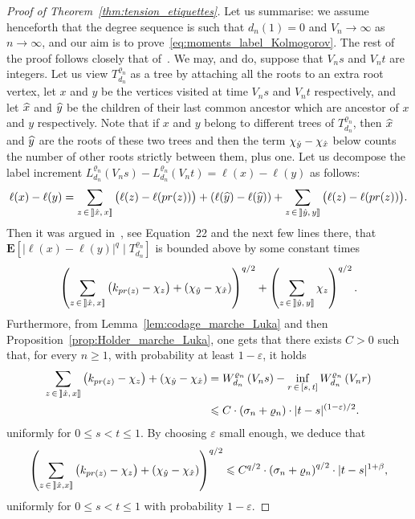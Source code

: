 \documentclass[AHL,Unicode,longabstracts,published]{cedram}
\newcommand{\rrbracket}{\mathclose{]\mkern -2.7mu]}}
\newcommand{\ensembles}[1]{\mathbf{#1}}
\newcommand{\E}{\ensembles{E}}
\newcommand{\1}{\ensembles{1}}
\renewcommand{\le}{\leqslant}
\renewcommand{\ge}{\geqslant}
\newcommand{\fn}{T_{d_n}^{\varrho_n}}
\newcommand{\Wfn}{W_{d_n}^{\varrho_n}}
\newcommand{\Lfn}{L_{d_n}^{\varrho_n}}
\newcommand{\vertices}{V}
\let\oldhat\hat
\renewcommand*{\hat}[1]{\mathchoice{\widehat{#1}}{\widehat{#1}}{\oldhat{#1}}{\oldhat{#1}}}
\begin{document}
\begin{proof}[Proof of Theorem~\ref{thm:tension_etiquettes}]
Let us summarise: we assume henceforth that the degree sequence is such that $d_{n}(1) = 0$ and $\vertices_{n} \to \infty$ as $n\to \infty$, and our aim is to prove~\eqref{eq:moments_label_Kolmogorov}. The rest of the proof follows closely that of~\cite[Proposition~7]{Mar18b}. We may, and do, suppose that $\vertices_n s$ and $\vertices_n t$ are integers. Let us view $\fn$ as a tree by attaching all the roots to an extra root vertex, let $x$ and $y$ be the vertices visited at time $\vertices_n s$ and $\vertices_n t$ respectively, and let $\hat{x}$ and $\hat{y}$ be the children of their last common ancestor which are ancestor of $x$ and $y$ respectively. Note that if $x$ and $y$ belong to different trees of $\fn$, then $\hat{x}$ and $\hat{y}$ are the roots of these two trees and then the term $\chi_{\hat{y}} - \chi_{\hat{x}}$ below counts the number of other roots strictly between them, plus one. Let us decompose the label increment $\Lfn(\vertices_n s) - \Lfn(\vertices_n t) = \ell(x)-\ell(y)$ as follows:
\[
\ell(x)-\ell(y) = \sum_{z\,\in\,\mathopen{\rrbracket} \hat{x},\,x \mathclose{\rrbracket}} \big(\ell(z)-\ell(pr(z))\big) + (\ell(\hat{y})-\ell(\hat{y})) + \sum_{z\,\in\,\mathopen{\rrbracket} \hat{y},\,y \mathclose{\rrbracket}} \big(\ell(z)-\ell(pr(z))\big).
\]
Then it was argued in~\cite{Mar18b}, see Equation~22 and the next few lines there, that $\E[|\ell(x)-\ell(y)|^q \mid \fn]$ is bounded above by some constant times
\[
\left(\sum_{z\,\in\,\mathopen{\rrbracket} \hat{x},\,x \mathclose{\rrbracket}} \left(k_{pr(z)}-\chi_{z}\right) + \left(\chi_{\hat{y}} - \chi_{\hat{x}}\right)\right)^{q/2} + \left(\sum_{z\,\in\,\mathopen{\rrbracket} \hat{y},\,y \mathclose{\rrbracket}} \chi_{z}\right)^{q/2}.
\]
Furthermore, from Lemma~\ref{lem:codage_marche_Luka} and then Proposition~\ref{prop:Holder_marche_Luka}, one gets that there exists $C > 0$ such that, for every $n \ge 1$, with probability at least $1-\varepsilon$, it holds
\begin{align*}
\sum_{z\,\in\,\mathopen{\rrbracket} \hat{x},\,x \mathclose{\rrbracket}} \left(k_{pr(z)}-\chi_{z}\right) + \left(\chi_{\hat{y}} - \chi_{\hat{x}}\right) &= \Wfn\left(\vertices_n s\right) - \inf_{r\,\in\,[s,\,t]} \Wfn\left(\vertices_n r\right)
\\
&\le C \cdot\left(\sigma_n + \varrho_n\right) \cdot |t-s|^{(1-\varepsilon)/2}.
\end{align*}
uniformly for $0 \le s < t \le 1$. By choosing $\varepsilon$ small enough, we deduce that
\[
\left(\sum_{z\,\in\,\mathopen{\rrbracket} \hat{x}, x \mathclose{\rrbracket}} \left(k_{pr(z)}-\chi_{z}\right) + \left(\chi_{\hat{y}} - \chi_{\hat{x}}\right)\right)^{q/2}
\le C^{q/2} \cdot \left(\sigma_n + \varrho_n\right)^{q/2} \cdot |t-s|^{1+\beta},
\]
uniformly for $0 \le s < t \le 1$ with probability $1-\varepsilon$.



\end{proof}
\end{document}
